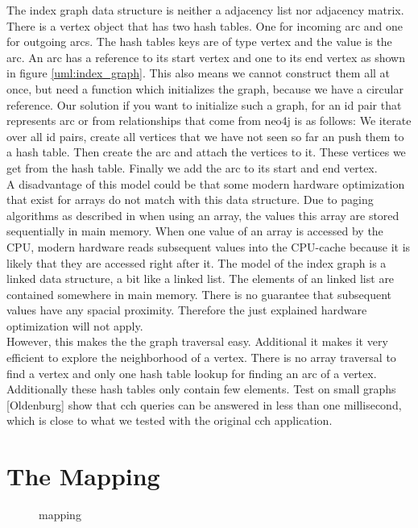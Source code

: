 The index graph data structure is neither a adjacency list nor adjacency matrix. There is a vertex object that has two hash tables. One for incoming arc and one for outgoing arcs. The hash tables keys are of type vertex and the value is the arc. An arc has a reference to its start vertex and one to its end vertex as shown in figure \ref{uml:index_graph}. 
This also means we cannot construct them all at once, but need a function which initializes the graph, because we have a circular reference. Our solution if you want to initialize such a graph, for an id pair that represents arc or from relationships that come from neo4j is as follows: We iterate over all id pairs, create all vertices that we have not seen so far an push them to a hash table. 
Then create the arc and attach the vertices to it. These vertices we get from the hash table. Finally we add the arc to its start and end vertex.
\\
A disadvantage of this model could be that some modern hardware optimization that exist for arrays do not match with this data structure. Due to paging algorithms as described in \cite[Modern Operatins Systems]{andrew2015modern} when using an array, the values this array are stored sequentially in main memory. When one value of an array is accessed by the CPU, modern hardware reads subsequent values into the CPU-cache because it is likely that they are accessed right after it. The model of the index graph is a linked data structure, a bit like a linked list. The elements of an linked list are contained somewhere in main memory. There is no guarantee that subsequent values have any spacial proximity. Therefore the just explained hardware optimization will not apply. \\ %
However, this makes the the graph traversal easy. Additional it makes it very efficient to explore the neighborhood of a vertex. There is no array traversal to find a vertex and only one hash table lookup for finding an arc of a vertex. Additionally these hash tables only contain few elements. Test on small graphs [Oldenburg] show that cch queries can be answered in less than one millisecond, which is close to what we tested with the original cch application.

\section{The Mapping}\label{sec:mapping}
\begin{figure}
    \centering
    
    \caption{mapping}
    \label{fig:mapping}
\end{figure}

